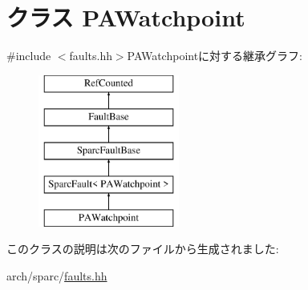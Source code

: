 \hypertarget{classSparcISA_1_1PAWatchpoint}{
\section{クラス PAWatchpoint}
\label{classSparcISA_1_1PAWatchpoint}
}


{\ttfamily \#include $<$faults.hh$>$}PAWatchpointに対する継承グラフ:\begin{figure}[H]
\begin{center}
\leavevmode
\includegraphics[height=5cm]{classSparcISA_1_1PAWatchpoint}
\end{center}
\end{figure}


このクラスの説明は次のファイルから生成されました:\begin{DoxyCompactItemize}
\item 
arch/sparc/\hyperlink{arch_2sparc_2faults_8hh}{faults.hh}\end{DoxyCompactItemize}
